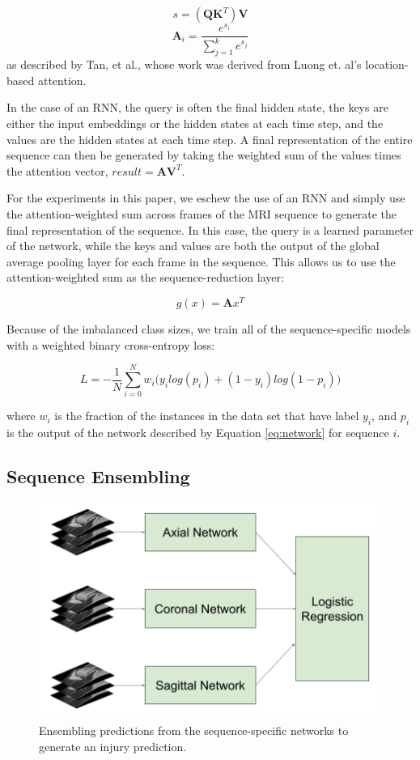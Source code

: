 \documentclass[10pt,twocolumn,letterpaper]{article}
\begin{document}
$$s = (\textbf{Q}\textbf{K}^T)\textbf{V}$$
$$\textbf{A}_i = \frac{e^{s_i}}{\sum_{j=1}^k e^{s_j}}$$
 as described by Tan, et al.\cite{tan2018deep}, whose work was derived from Luong et. al's location-based attention\cite{luong2015effective}.

In the case of an RNN, the query is often the final hidden state, the keys are either the input embeddings or the hidden states at each time step, and the values are the hidden states at each time step. A final representation of the entire sequence can then be generated by taking the weighted sum of the values times the attention vector, $result = \textbf{A} \textbf{V}^T$.

For the experiments in this paper, we eschew the use of an RNN and simply use the attention-weighted sum across frames of the MRI sequence to generate the final representation of the sequence. In this case, the query is a learned parameter of the network, while the keys and values are both the output of the global average pooling layer for each frame in the sequence. This allows us to use the attention-weighted sum as the sequence-reduction layer:

$$ g(x) = \textbf{A} x^T$$

Because of the imbalanced class sizes, we train all of the sequence-specific models with a weighted binary cross-entropy loss:

$$ L = -\frac{1}{N} \sum_{i=0}^N w_i \big(y_i log(p_i) + (1 - y_i) log(1 - p_i)\big)$$

where $w_i$ is the fraction of the instances in the data set that have label $y_i$, and $p_i$ is the output of the network described by Equation \ref{eq:network} for sequence $i$.

\subsection{Sequence Ensembling}


\begin{figure}
\begin{center}
\includegraphics[width=0.8\linewidth]{../images/diagram/ensemble.png}
\end{center}
   \caption{Ensembling predictions from the sequence-specific networks to generate an injury prediction.}
\label{fig:ensemble}
\end{figure}
\end{document}
